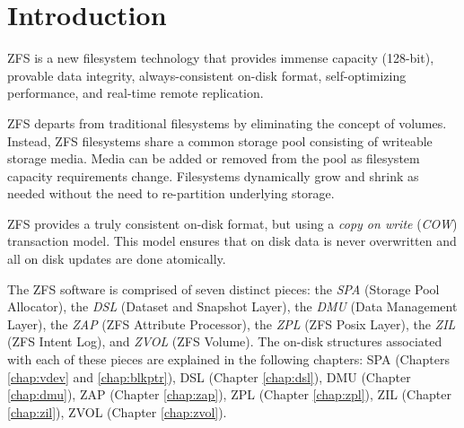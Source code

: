 \chapter*{Introduction}

ZFS is a new filesystem technology
that provides immense capacity (128-bit),
provable data integrity,
always-consistent on-disk format,
self-optimizing performance,
and real-time remote replication.

ZFS departs from traditional filesystems by eliminating the concept of volumes.
Instead,
ZFS filesystems share a common storage pool
consisting of writeable storage media.
Media can be added or removed from the pool
as filesystem capacity requirements change.
Filesystems dynamically grow and shrink as needed
without the need to re-partition underlying storage.

ZFS provides a truly consistent on-disk format,
but using a \emph{copy on write} (\emph{COW}) transaction model.
This model ensures that on disk data is never overwritten
and all on disk updates are done atomically.

The ZFS software is comprised of seven distinct pieces:
the \emph{SPA} (Storage Pool Allocator),
the \emph{DSL} (Dataset and Snapshot Layer),
the \emph{DMU} (Data Management Layer),
the \emph{ZAP} (ZFS Attribute Processor),
the \emph{ZPL} (ZFS Posix Layer),
the \emph{ZIL} (ZFS Intent Log),
and \emph{ZVOL} (ZFS Volume).
The on-disk structures associated with each of these pieces are explained in the following chapters:
SPA ({Chapters \ref{chap:vdev} and \ref{chap:blkptr}}),
DSL (Chapter \ref{chap:dsl}),
DMU (Chapter \ref{chap:dmu}),
ZAP (Chapter \ref{chap:zap}),
ZPL (Chapter \ref{chap:zpl}),
ZIL (Chapter \ref{chap:zil}),
ZVOL (Chapter \ref{chap:zvol}).

